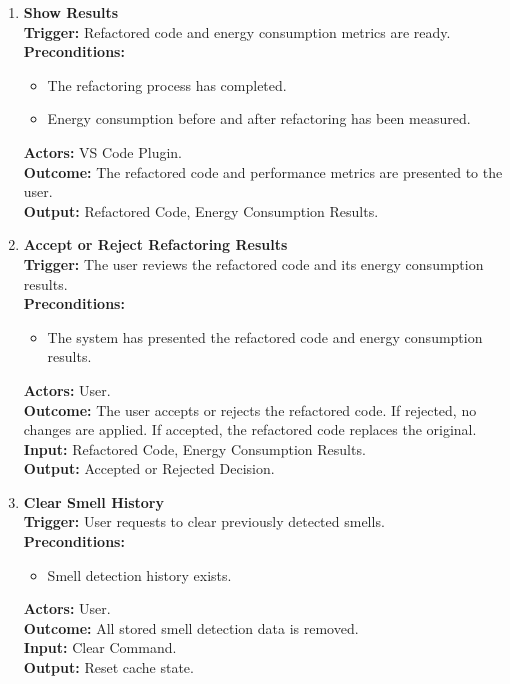 \documentclass[12pt]{article}
\begin{document}
\begin{enumerate}[label={\bf PUC \arabic*:}, wide=0pt, font=\itshape]
  \item \textbf{Show Results} \\[2mm]
    \textbf{Trigger:} Refactored code and energy consumption metrics
    are ready. \\[2mm]
    \textbf{Preconditions:}
    \begin{itemize}
      \item The refactoring process has completed.
      \item Energy consumption before and after refactoring has been measured.
    \end{itemize}
    \textbf{Actors:} VS Code Plugin. \\
    \textbf{Outcome:} The refactored code and performance metrics are
    presented to the user. \\
    \textbf{Output:} Refactored Code, Energy Consumption Results.

  \item \textbf{Accept or Reject Refactoring Results} \\[2mm]
    \textbf{Trigger:} The user reviews the refactored code and its
    energy consumption results. \\[2mm]
    \textbf{Preconditions:}
    \begin{itemize}
      \item The system has presented the refactored code and energy
        consumption results.
    \end{itemize}
    \textbf{Actors:} User. \\
    \textbf{Outcome:} The user accepts or rejects the refactored
    code. If rejected, no changes are applied. If accepted, the
    refactored code replaces the original. \\
    \textbf{Input:} Refactored Code, Energy Consumption Results. \\
    \textbf{Output:} Accepted or Rejected Decision.

  \item \textbf{Clear Smell History} \\[2mm]
    \textbf{Trigger:} User requests to clear previously detected smells. \\[2mm]
    \textbf{Preconditions:}
    \begin{itemize}
      \item Smell detection history exists.
    \end{itemize}
    \textbf{Actors:} User. \\
    \textbf{Outcome:} All stored smell detection data is removed. \\
    \textbf{Input:} Clear Command. \\
    \textbf{Output:} Reset cache state.


\end{enumerate}
\end{document}
